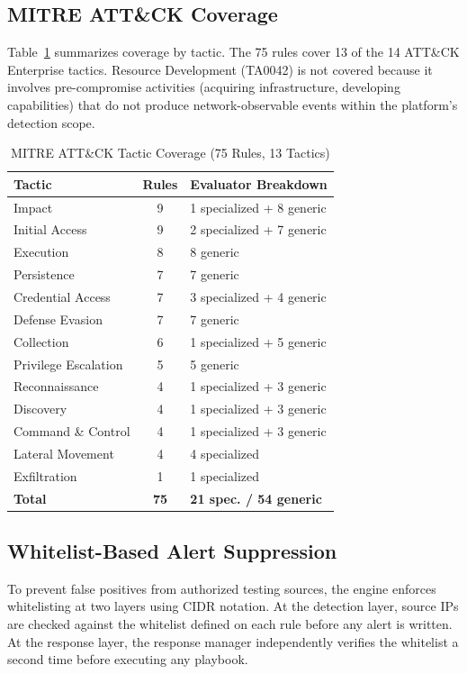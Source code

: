 \documentclass[conference,10pt]{IEEEtran}
\begin{document}
\subsection{MITRE ATT\&CK Coverage}

Table~\ref{tab:mitre_coverage} summarizes coverage by tactic. The 75 rules cover 13 of the 14 ATT\&CK Enterprise tactics. Resource Development (TA0042) is not covered because it involves pre-compromise activities (acquiring infrastructure, developing capabilities) that do not produce network-observable events within the platform's detection scope.

\begin{table}[t]
\centering
\caption{MITRE ATT\&CK Tactic Coverage (75 Rules, 13 Tactics)}
\label{tab:mitre_coverage}
\begin{tabular}{l c l}
\toprule
\textbf{Tactic} & \textbf{Rules} & \textbf{Evaluator Breakdown} \\
\midrule
Impact & 9 & 1 specialized + 8 generic \\
Initial Access & 9 & 2 specialized + 7 generic \\
Execution & 8 & 8 generic \\
Persistence & 7 & 7 generic \\
Credential Access & 7 & 3 specialized + 4 generic \\
Defense Evasion & 7 & 7 generic \\
Collection & 6 & 1 specialized + 5 generic \\
Privilege Escalation & 5 & 5 generic \\
Reconnaissance & 4 & 1 specialized + 3 generic \\
Discovery & 4 & 1 specialized + 3 generic \\
Command \& Control & 4 & 1 specialized + 3 generic \\
Lateral Movement & 4 & 4 specialized \\
Exfiltration & 1 & 1 specialized \\
\midrule
\textbf{Total} & \textbf{75} & \textbf{21 spec. / 54 generic} \\
\bottomrule
\end{tabular}
\end{table}

\subsection{Whitelist-Based Alert Suppression}

To prevent false positives from authorized testing sources, the engine enforces whitelisting at two layers using CIDR notation. At the detection layer, source IPs are checked against the whitelist defined on each rule before any alert is written. At the response layer, the response manager independently verifies the whitelist a second time before executing any playbook.
\end{document}

